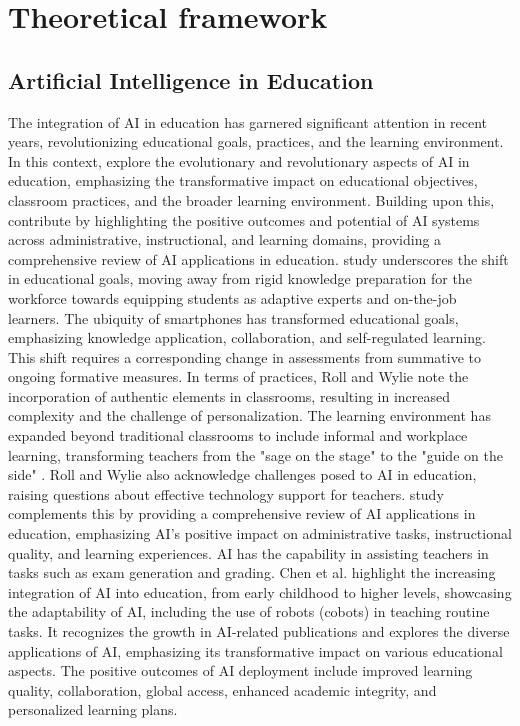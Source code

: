 \section{Theoretical framework}\label{sec-theoreticalframework}
\subsection{Artificial Intelligence in Education}\label{sub-sec-artificialintelligenceineducation}

The integration of AI in education has garnered significant attention in
recent years, revolutionizing educational goals, practices, and the
learning environment. In this context, \textcite{roll2016} explore the
evolutionary and revolutionary aspects of AI in education, emphasizing
the transformative impact on educational objectives, classroom
practices, and the broader learning environment. Building upon this,
\textcite{chen2020} contribute by highlighting the positive
outcomes and potential of AI systems across administrative,
instructional, and learning domains, providing a comprehensive review of
AI applications in education.  
study underscores the shift in educational goals, moving away from rigid
knowledge preparation for the workforce towards equipping students as
adaptive experts and on-the-job learners. The ubiquity of smartphones
has transformed educational goals, emphasizing knowledge application,
collaboration, and self-regulated learning. This shift requires a
corresponding change in assessments from summative to ongoing formative
measures. In terms of practices, Roll and Wylie note the incorporation
of authentic elements in classrooms, resulting in increased complexity
and the challenge of personalization. The learning environment has
expanded beyond traditional classrooms to include informal and workplace
learning, transforming teachers from the "sage on the stage" to the
"guide on the side" \cite[p.~592]{roll2016}. Roll and Wylie also
acknowledge challenges posed to AI in education, raising questions about
effective technology support for teachers.  study
complements this by providing a comprehensive review of AI applications
in education, emphasizing AI's positive impact on
administrative tasks, instructional quality, and learning experiences.
AI has the capability in assisting teachers in tasks such as exam
generation and grading. Chen et al. highlight the increasing integration
of AI into education, from early childhood to higher levels, showcasing
the adaptability of AI, including the use of robots (cobots) in teaching
routine tasks. It recognizes the growth in AI-related publications and
explores the diverse applications of AI, emphasizing its transformative
impact on various educational aspects. The positive outcomes of AI
deployment include improved learning quality, collaboration, global
access, enhanced academic integrity, and personalized learning plans.

